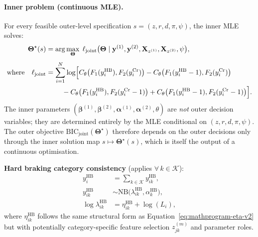 \documentclass[letterpaper,8pt]{extarticle}  %
\begin{document}
\begin{doublespacing}
\begin{linenumbers}
\paragraph{Inner problem (continuous MLE).}
For every feasible outer-level specification $s = (z,r,d,\pi,\psi)$, the inner MLE solves:
\begin{align}
  \boldsymbol\Theta^\star(s) &=
    \arg\max_{\boldsymbol\Theta} \; \ell_{\text{joint}}\bigl(\boldsymbol\Theta \mid \mathbf{y}^{(1)}, \mathbf{y}^{(2)}, \mathbf{X}_{z^{(1)}}, \mathbf{X}_{z^{(2)}}, \psi\bigr), \label{eq:mathprogram-c6}\\[4pt]
  \text{where}\quad \ell_{\text{joint}} &= \sum_{i=1}^{N} \log\Bigl[
    C_\theta\bigl(F_1(y_{i}^{\text{HB}}), F_2(y_{i}^{\text{Cr}})\bigr)
    - C_\theta\bigl(F_1(y_{i}^{\text{HB}}-1), F_2(y_{i}^{\text{Cr}})\bigr) \nonumber\\
    &\qquad\; - C_\theta\bigl(F_1(y_{i}^{\text{HB}}), F_2(y_{i}^{\text{Cr}}-1)\bigr)
    + C_\theta\bigl(F_1(y_{i}^{\text{HB}}-1), F_2(y_{i}^{\text{Cr}}-1)\bigr)
  \Bigr]. \label{eq:mathprogram-c7}
\end{align}
The inner parameters $(\boldsymbol\beta^{(1)}, \boldsymbol\beta^{(2)}, \boldsymbol\alpha^{(1)}, \boldsymbol\alpha^{(2)}, \theta)$ are \emph{not} outer decision variables; they are determined entirely by the MLE conditional on $(z,r,d,\pi,\psi)$. The outer objective $\text{BIC}_{\text{joint}}(\boldsymbol\Theta^\star)$ therefore depends on the outer decisions only through the inner solution map $s \mapsto \boldsymbol\Theta^\star(s)$, which is itself the output of a continuous optimisation.

\noindent\textbf{Hard braking category consistency} (applies $\forall\, k \in \mathcal{K}$):
\begin{align}
  y_i^{\text{HB}} &= \sum_{k \in \mathcal{K}} y_{ik}^{\text{HB}}, \label{eq:mathprogram-c8}\\
  y_{ik}^{\text{HB}} &\sim \text{NB}\bigl(\lambda_{ik}^{\text{HB}}, \alpha_k^{\text{HB}}\bigr), \label{eq:mathprogram-c9}\\
  \log\lambda_{ik}^{\text{HB}} &= \eta_{ik}^{\text{HB}} + \log(L_i), \label{eq:mathprogram-c10}
\end{align}
where $\eta_{ik}^{\text{HB}}$ follows the same structural form as Equation~\eqref{eq:mathprogram-eta-v2} but with potentially category-specific feature selection $z_{jk}^{(m)}$ and parameter roles.


\end{linenumbers}
\end{doublespacing}
\end{document}
